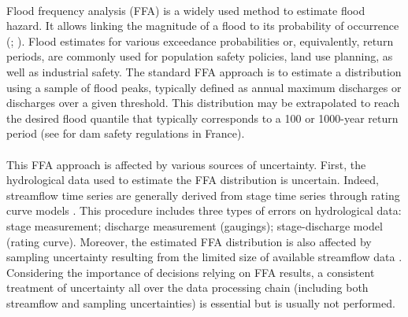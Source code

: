 \documentclass[11pt]{article}
\begin{document}
    \paragraph{}
    Flood frequency analysis (FFA) is a widely used method to estimate flood hazard. It allows linking the magnitude of a flood to its probability of occurrence (\citet{hamed_flood_2019}; \citet{jain_design_2019}). Flood estimates for various exceedance probabilities or, equivalently, return periods, are commonly used for population safety policies, land use planning, as well as industrial safety. The standard FFA approach is to estimate a distribution using a sample of flood peaks, typically defined as annual maximum discharges or discharges over a given threshold. This distribution may be extrapolated to reach the desired flood quantile that typically corresponds to a 100 or 1000-year return period (see \cite{le_delliou_recommandations_2014} for dam safety regulations in France). 
    
    \paragraph{}
    This FFA approach is affected by various sources of uncertainty. First, the hydrological data used to estimate the FFA distribution is uncertain. Indeed, streamflow time series are generally derived from stage time series through rating curve models \citep{rantz_measurement_1982}. This procedure includes three types of errors on hydrological data: stage measurement; discharge measurement (gaugings); stage-discharge model (rating curve). Moreover, the estimated FFA distribution is also affected by sampling uncertainty resulting from the limited size of available streamflow data \citep{kjeldsen_uncertainty_2011}. Considering the importance of decisions relying on FFA results, a consistent treatment of uncertainty all over the data processing chain (including both streamflow and sampling uncertainties) is essential but is usually not performed.
    
\end{document}
